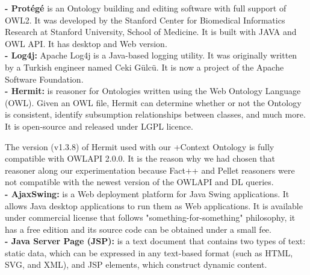 \textbf{- Protégé} is an Ontology building and editing software with full support of OWL2. It was developed by the Stanford Center for Biomedical Informatics Research at Stanford University, School of Medicine. It is built with JAVA and OWL API. It has desktop and Web version. \\

\textbf{- Log4j:} Apache Log4j is a Java-based logging utility. It was originally written by  a Turkish engineer named Ceki Gülcü. It is now a project of the Apache Software Foundation.\\

\textbf{- Hermit:} is reasoner for Ontologies written using the Web Ontology Language (OWL). Given an OWL file, Hermit can determine whether or not the Ontology is consistent, identify subsumption relationships between classes, and much more. It is open-source and released under LGPL licence. 

The version (v1.3.8) of Hermit used with our +Context Ontology is fully compatible with OWLAPI 2.0.0. It is the reason why we had chosen that reasoner along our experimentation because Fact++ and Pellet reasoners were not compatible with the newest version of the OWLAPI and DL queries. \\

\textbf{- AjaxSwing:}  is a Web deployment platform for Java Swing applications. It allows Java desktop applications to run them as Web applications. It is available under commercial license that follows "something-for-something" philosophy, it has a free edition and its source code can be obtained under a small fee. \\

\textbf{- Java Server Page (JSP):} is a text document that contains two types of text: static data, which can be expressed in any text-based format (such as HTML, SVG, and XML), and JSP elements, which construct dynamic content. \\

